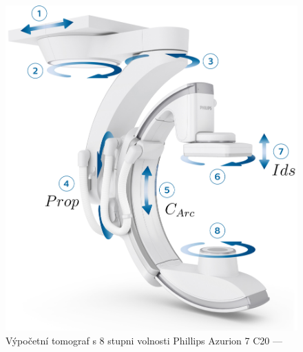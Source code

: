\begin{figure}[H]
    \centering
    \includegraphics[width=\textwidth]{Img/Azurion 7 C20 with FlexArm modified.png}
    \caption[Výpočetní tomograf s 8 stupni volnosti Phillips Azurion 7 C20]{Výpočetní tomograf s 8 stupni volnosti Phillips Azurion 7 C20 --- \cite{Azurion}}
    \label{fig:Výpočetní tomograf}
\end{figure}
